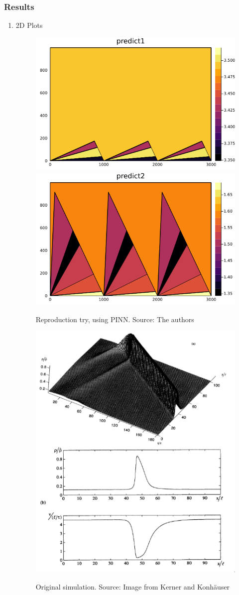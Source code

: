 \documentclass[11pt]{article}
\begin{document}
\subsubsection{Results}
\label{sec:org3543f28}
\begin{enumerate}
\item 2D Plots
\label{sec:orge00c713}

\begin{figure}[!htb]
  \centering
  \caption{\label{fig:sim1} Reproduction try, using PINN. Source: The authors}
  \includegraphics[width=0.45\linewidth]{Resources/img/sol_variable_corrected_bcs31.png}
  \includegraphics[width=0.45\linewidth]{Resources/img/sol_variable_corrected_bcs32.png}
  \\ %
\end{figure}

\begin{figure}[!htb]
  \centering
  \caption{\label{fig:sim2} Original simulation. Source: Image from Kerner and Konhäuser \cite{kerner1993}}
  \includegraphics[width=0.4\linewidth]{Resources/img/kerner.png}
  \\  %
\end{figure}


\end{enumerate}
\end{document}
